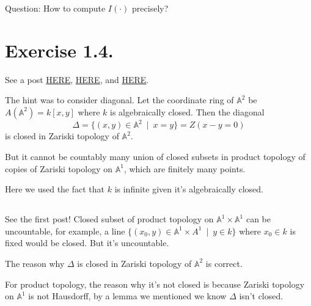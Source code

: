 Question: How to compute $I(\cdot)$ precisely?

\section{Exercise 1.4.}

See a post \href{https://math.stackexchange.com/questions/128102/why-is-the-zariski-topology-on-bbb-a2-not-the-product-topology-on-bbb-a1}{HERE}, \href{https://math.stackexchange.com/questions/2119539/proving-that-the-zariski-topology-in-mathbba2-is-not-the-product-topology}{HERE},
and \href{https://math.stackexchange.com/questions/1607060/show-that-the-zariski-topology-on-a2-is-not-the-product-topology-on-a1-tim}{HERE}.

The hint was to consider diagonal. Let the coordinate ring of $\mathbb A^2$ be $A(\mathbb A^2)=k[x,y]$ where $k$ is algebraically closed. 
Then the diagonal \[\Delta =\{(x,y)\in\mathbb A^2 ~\mid~ x=y\}= Z(x-y=0)\] is closed in Zariski topology of $\mathbb A^2$.

But it cannot be countably many union of closed subsets in product topology of copies of Zariski topology on $\mathbb A^1$, which are finitely many points. 

Here we used the fact that $k$ is infinite given it's algebraically closed.

\subsection{}

See the first post!
Closed subset of product topology on $\mathbb A^1\times \mathbb A^1$ can be uncountable, for example, a line $\{(x_0,y)\in\mathbb A^1\times A^1 ~\mid~ y\in k\}$ where $x_0\in k$ is fixed would be closed. But it's uncountable. 

The reason why $\Delta$ is closed in Zariski topology of $\mathbb A^2$ is correct. 

For product topology, the reason why it's not closed is because Zariski topology on $\mathbb A^1$ is not Hausdorff, by a lemma we mentioned we know $\Delta$ isn't closed. 

